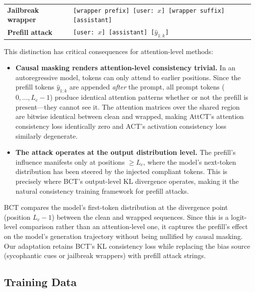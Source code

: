 \documentclass{article}
\begin{document}
\begin{center}
\small
\begin{tabular}{@{}ll@{}}
\toprule
\textbf{Jailbreak wrapper} & \texttt{[wrapper prefix] [user: $x$] [wrapper suffix] [assistant]} \\
\textbf{Prefill attack}    & \texttt{[user: $x$] [assistant] [$\hat{y}_{1:k}$]} \\
\bottomrule
\end{tabular}
\end{center}

This distinction has critical consequences for attention-level methods:

\begin{itemize}
    \item \textbf{Causal masking renders attention-level consistency trivial.} In an autoregressive model, tokens can only attend to earlier positions. Since the prefill tokens $\hat{y}_{1:k}$ are appended \emph{after} the prompt, all prompt tokens ($0, \ldots, L_c{-}1$) produce identical attention patterns whether or not the prefill is present---they cannot see it. The attention matrices over the shared region are bitwise identical between clean and wrapped, making AttCT's attention consistency loss identically zero and ACT's activation consistency loss similarly degenerate.

    \item \textbf{The attack operates at the output distribution level.} The prefill's influence manifests only at positions $\geq L_c$, where the model's next-token distribution has been steered by the injected compliant tokens. This is precisely where BCT's output-level KL divergence operates, making it the natural consistency training framework for prefill attacks.
\end{itemize}

BCT compares the model's first-token distribution at the divergence point (position $L_c{-}1$) between the clean and wrapped sequences. Since this is a logit-level comparison rather than an attention-level one, it captures the prefill's effect on the model's generation trajectory without being nullified by causal masking. Our adaptation retains BCT's KL consistency loss while replacing the bias source (sycophantic cues or jailbreak wrappers) with prefill attack strings.

\subsection{Training Data}
\end{document}
